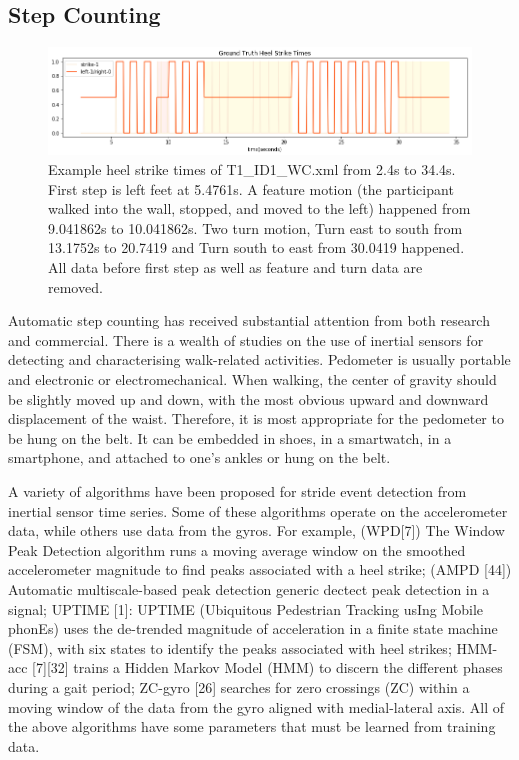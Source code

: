 \documentclass[11pt]{article}
\begin{document}
\subsection{Step Counting}

\begin{figure}[ht]
\centering
\includegraphics[scale=0.5]{ground_truth_2}
\caption{Example heel strike times of T1\_ID1\_WC.xml from 2.4s to 34.4s. First step is left feet at 5.4761s. A feature motion (the participant walked into the wall, stopped, and moved to the left) happened from 9.041862s to 10.041862s. Two turn motion, Turn east to south from 13.1752s to 20.7419 and Turn south to east from 30.0419 happened. All data before first step as well as feature and turn data are removed.}
\label{fig:label}
\end{figure}


Automatic step counting has received substantial attention from both  research and commercial. There is a wealth of studies on the use of inertial sensors for detecting and characterising walk-related activities. Pedometer is usually portable and electronic or electromechanical. When walking, the center of gravity should be slightly moved up and down, with the most obvious upward and downward displacement of the waist. Therefore, it is most appropriate for the pedometer to be hung on the belt. It can be embedded in shoes, in a smartwatch, in a smartphone, and attached to one’s ankles or hung on the belt. 

A variety of algorithms have been proposed for stride event detection from inertial sensor time series. Some of these algorithms operate on the accelerometer data, while others use data from the gyros. For example, (WPD[7]) The Window Peak Detection algorithm runs a moving average window on the smoothed accelerometer magnitude to find peaks associated with a heel strike; (AMPD [44]) Automatic multiscale-based peak detection generic dectect peak detection in a signal; UPTIME [1]: UPTIME (Ubiquitous Pedestrian Tracking usIng Mobile phonEs) uses the de-trended magnitude of acceleration in a finite state machine (FSM), with six states to identify the peaks associated with heel strikes; HMM-acc [7][32] trains a Hidden Markov Model (HMM) to discern the different phases during a gait period; ZC-gyro [26] searches for zero crossings (ZC) within a moving window of the data from the gyro aligned with medial-lateral axis. All of the above algorithms have some parameters that must be learned from training data.
\end{document}
